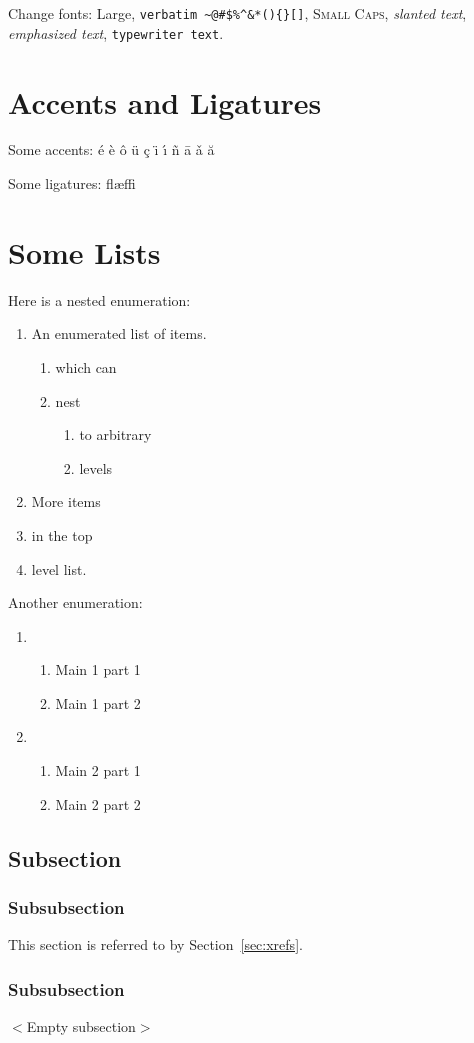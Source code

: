 Change fonts: {\Large Large},
\verb+verbatim ~@#$%^&*(){}[]+,
\textsc{Small Caps},
\textsl{slanted text},
\emph{emphasized text},
\texttt{typewriter text}.

\section{Accents and Ligatures}

Some accents:
\'{e}
\`{e}
\^{o}
\"{u}
\c{c}
\"{\i}
\'{\i}
\~{n}
\={a}
\v{a}
\u{a}

\noindent Some ligatures:
fl{\ae}ffi


\section{Some Lists}

Here is a nested enumeration:
\begin{enumerate}
	\item An enumerated list of items.
	\begin{enumerate}
		\item which can 
		\item nest
		\begin{enumerate}
			\item to arbitrary
			\item levels
		\end{enumerate}
	\end{enumerate}
	\item More items
	\item in the top
	\item level list.
\end{enumerate}
Another enumeration:
\begin{enumerate}
	\item
	\begin{enumerate}
		\item Main 1 part 1
		\item Main 1 part 2
	\end{enumerate}
	\item
	\begin{enumerate}
		\item Main 2 part 1
		\item Main 2 part 2
	\end{enumerate}
\end{enumerate}

\subsection{Subsection}

\subsubsection{Subsubsection}
\label{sec:nested}
This section is referred to by Section~\ref{sec:xrefs}.

\subsubsection{Subsubsection}
\textsf{$<$Empty subsection$>$}

